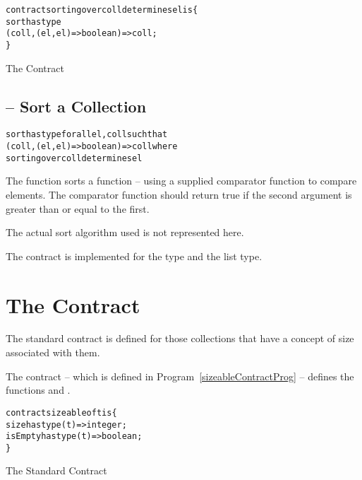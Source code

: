 \begin{program}[H]
\begin{alltt}
contract sorting over coll determines el is \{
  sort has type 
      (coll,(el,el)=>boolean) => coll;
\}
\end{alltt}
\caption{The  Contract\label{sortContractProg}}
\end{program}

\subsection{ -- Sort a Collection}
\label{sortFunction}
\begin{alltt}
sort has type for all el, coll such that
    (coll,(el,el)=>boolean) => coll where
       sorting over coll determines el
\end{alltt}

The  function sorts a function -- using a supplied comparator function to compare elements. The comparator function should return true if the second argument is greater than or equal to the first.

\begin{aside}
The actual sort algorithm used is not represented here.
\end{aside}

The  contract is implemented for the  type and the  list type.

\section{The  Contract}
\label{sizeableContract}
The standard  contract is defined for those collections that have a concept of size associated with them.


The  contract -- which is defined in Program~\vref{sizeableContractProg} -- defines the functions  and .

\begin{program}
\begin{alltt}
contract sizeable of t is \{
  size has type (t) => integer;
  isEmpty has type (t) => boolean;
\}
\end{alltt}
\caption{The Standard  Contract\label{sizeableContractProg}}
\end{program}

